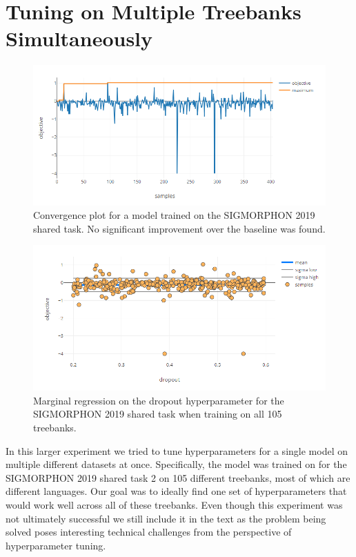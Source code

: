\section{Tuning on Multiple Treebanks Simultaneously}
\label{section:multiple-treebanks-failed}

\begin{figure}
	\begin{center}
		\includegraphics[width=1.0\textwidth]{images/sigmorphon-convergence.png}
		\caption{Convergence plot for a model trained on the SIGMORPHON 2019 shared task. No significant improvement over the baseline was found.}
		\label{figure:sigmorphon-convergence}
	\end{center}
\end{figure}

\begin{figure}
	\begin{center}
		\includegraphics[width=1.0\textwidth]{images/sigmorphon-dropout.png}
		\caption{Marginal regression on the dropout hyperparameter for the SIGMORPHON 2019 shared task when training on all 105 treebanks.}
		\label{figure:sigmorphon-dropout}
	\end{center}
\end{figure}

In this larger experiment we tried to tune hyperparameters for a single model on multiple different datasets at once. Specifically, the model was trained on for the SIGMORPHON 2019 shared task 2 \citep{sigmorphon2019task2} on 105 different treebanks, most of which are different languages. Our goal was to ideally find one set of hyperparameters that would work well across all of these treebanks. Even though this experiment was not ultimately successful we still include it in the text as the problem being solved poses interesting technical challenges from the perspective of hyperparameter tuning.

